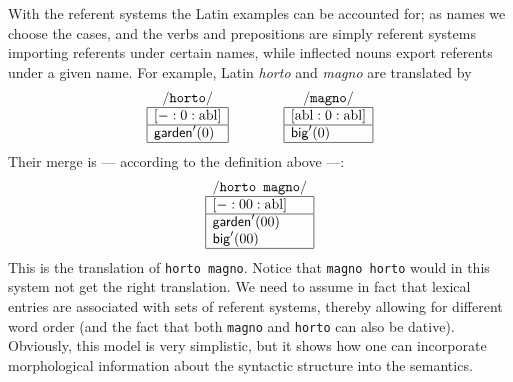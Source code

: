 With the referent systems the Latin examples can be accounted
for; as names we choose the cases, and the verbs and prepositions
are simply referent systems importing referents under certain
names, while inflected nouns export referents under a given
name. For example, Latin {\it horto\/} and {\it magno\/}
are translated by
$$\begin{array}{|l|}
\multicolumn{1}{c}{/\mbox{\tt horto}/} \\
\hline
\rfs{- : 0 : \mbox{\rm abl}} \\\hline
\mbox{\sf garden}'(0)
\\\hline
\end{array}
\qquad\qquad
\begin{array}{|l|}
\multicolumn{1}{c}{/\mbox{\tt magno}/} \\
\hline
\rfs{\mbox{\rm abl} : 0 : \mbox{\rm abl}}
\\\hline
\mbox{\sf big}'(0) \\\hline
\end{array}$$
Their merge is --- according to the definition above ---:
$$\begin{array}{|l|}
\multicolumn{1}{c}{/\mbox{\tt horto magno}/} \\
\hline
\rfs{- : 00 : \mbox{\rm abl}}
\\\hline
\mbox{\sf garden}'(00) \\
\mbox{\sf big}'(00)
\\\hline
\end{array}$$
This is the translation of {\tt horto magno}. Notice that
{\tt magno horto} would in this system not get the right
translation. We need to assume in fact that lexical entries
are associated with sets of referent systems, thereby allowing
for different word order (and the fact that both {\tt magno}
and {\tt horto} can also be dative). Obviously, this model
is very simplistic, but it shows how one can incorporate
morphological information about the syntactic structure into
the semantics.

